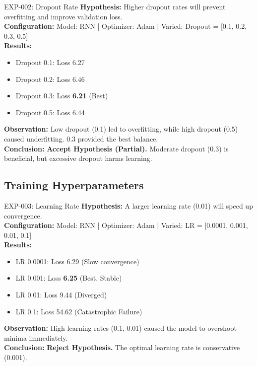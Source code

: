 \documentclass[12pt,a4paper]{article}
\begin{document}
\begin{experimentbox}{EXP-002: Dropout Rate}
\textbf{Hypothesis:} Higher dropout rates will prevent overfitting and improve validation loss. \\
\textbf{Configuration:} Model: RNN | Optimizer: Adam | Varied: Dropout = [0.1, 0.2, 0.3, 0.5] \\
\textbf{Results:}
\begin{itemize}
    \item Dropout 0.1: Loss 6.27
    \item Dropout 0.2: Loss 6.46
    \item Dropout 0.3: Loss \textbf{6.21} (Best)
    \item Dropout 0.5: Loss 6.44
\end{itemize}
\textbf{Observation:} Low dropout (0.1) led to overfitting, while high dropout (0.5) caused underfitting. 0.3 provided the best balance. \\
\textbf{Conclusion:} \textbf{Accept Hypothesis (Partial).} Moderate dropout (0.3) is beneficial, but excessive dropout harms learning.
\end{experimentbox}

\subsection{Training Hyperparameters}

\begin{experimentbox}{EXP-003: Learning Rate}
\textbf{Hypothesis:} A larger learning rate (0.01) will speed up convergence. \\
\textbf{Configuration:} Model: RNN | Optimizer: Adam | Varied: LR = [0.0001, 0.001, 0.01, 0.1] \\
\textbf{Results:}
\begin{itemize}
    \item LR 0.0001: Loss 6.29 (Slow convergence)
    \item LR 0.001: Loss \textbf{6.25} (Best, Stable)
    \item LR 0.01: Loss 9.44 (Diverged)
    \item LR 0.1: Loss 54.62 (Catastrophic Failure)
\end{itemize}
\textbf{Observation:} High learning rates (0.1, 0.01) caused the model to overshoot minima immediately. \\
\textbf{Conclusion:} \textbf{Reject Hypothesis.} The optimal learning rate is conservative (0.001).
\end{experimentbox}
\end{document}

